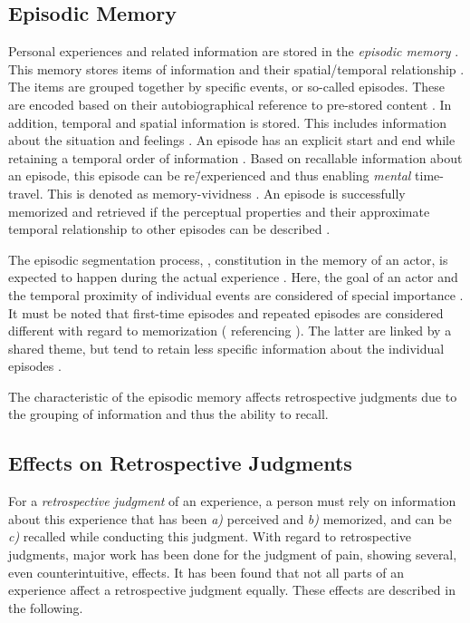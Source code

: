 \subsection{Episodic Memory}
Personal experiences and related information are stored in the \emph{episodic memory} \citep{tulving_episodic_1972}.
This memory stores items of information and their spatial\-/temporal relationship \citep[][p.\,385]{tulving_episodic_1972}.
The items are grouped together by specific events, or so-called episodes.
These are encoded based on their autobiographical reference to pre-stored content \citep[][p.\,385f.]{tulving_episodic_1972}.
In addition, temporal and spatial information is stored.
This includes information about the situation and feelings \citep[][p.\,385f.]{tulving_episodic_1972}.
An episode has an explicit start and end while retaining a temporal order of information \citep[][p.\,262]{conway_construction_2000}.
Based on recallable information about an episode, this episode can be re\=/experienced and thus enabling \emph{mental} time-travel.
This is denoted as memory-vividness \citep{conway_construction_2000}.
An episode is successfully memorized and retrieved if the perceptual properties and their approximate temporal relationship to other episodes can be described \citep{conway_construction_2000}.

The episodic segmentation process, \ie, constitution in the memory of an actor, is expected to happen during the actual experience \citep[][]{ezzyat_what_2011, kurby_segmentation_2008}.
Here, the goal of an actor and the temporal proximity of individual events are considered of special importance \citep[][]{black_episodes_1979}.
It must be noted that first-time episodes and repeated episodes are considered different with regard to memorization (\citet{conway_construction_2000} referencing \citet{barsalou_content_1988}).
The latter are linked by a shared theme, but tend to retain less specific information about the individual episodes \citep{robinson_first_1992}.

The characteristic of the episodic memory affects retrospective judgments due to the grouping of information and thus the ability to recall.

\subsection{Effects on Retrospective Judgments}\label{chap03:effects}
For a \emph{retrospective judgment} of an experience, a person must rely on information about this experience that has been \emph{a)} perceived and \emph{b)} memorized, and can be \emph{c)} recalled while conducting this judgment.
With regard to retrospective judgments, major work has been done for the judgment of pain, showing several, even counterintuitive, effects.
It has been found that not all parts of an experience affect a retrospective judgment equally.
These effects are described in the following.


